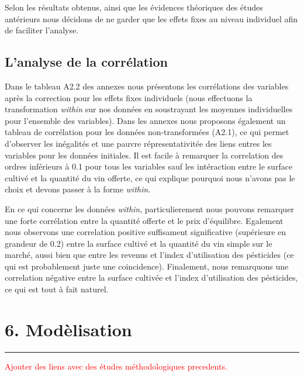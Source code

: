 \documentclass[11pt,]{article}
\begin{document}
\FloatBarrier

Selon les résultats obtenus, ainsi que les évidences théoriques des
études antérieurs nous décidons de ne garder que les effets fixes au
niveau individuel afin de faciliter l'analyse.

\hypertarget{lanalyse-de-la-correlation}{%
\subsection{L'analyse de la
corrélation}\label{lanalyse-de-la-correlation}}

Dans le tableau A2.2 des annexes nous présentons les corrélations des
variables après la correction pour les effets fixes individuels (nous
effectuons la transformation \emph{within} sur nos données en
soustrayant les moyennes individuelles pour l'ensemble des variables).
Dans les annexes nous proposons également un tableau de corrélation pour
les données non-transformées (A2.1), ce qui permet d'observer les
inégalités et une pauvre répresentativitée des liens entres les
variables pour les données initiales. Il est facile à remarquer la
correlation des ordres inférieurs à 0.1 pour tous les variables sauf les
intéraction entre le surface cultivé et la quantité du vin offerte, ce
qui explique pourquoi nous n'avons pas le choix et devons passer à la
forme \emph{within}.

En ce qui concerne les données \emph{within}, particulierement nous
pouvons remarquer une forte corrélation entre la quantité offerte et le
prix d'équilibre. Egalement nous observons une correlation positive
suffisament significative (supérieure en grandeur de 0.2) entre la
surface cultivé et la quantité du vin simple sur le marché, aussi bien
que entre les revenus et l'index d'utilisation des pésticides (ce qui
est probablement juste une coincidence). Finalement, nous remarquons une
correlation négative entre la surface cultivée et l'index d'utilisation
des pésticides, ce qui est tout à fait naturel.

\hypertarget{modelisation}{%
\section{6. Modèlisation}\label{modelisation}}

\noindent

\rule[0.5ex]{\linewidth}{1pt}

\textcolor{red}{Ajouter des liens avec des études méthodologiques precedents.}

\noindent
\end{document}
